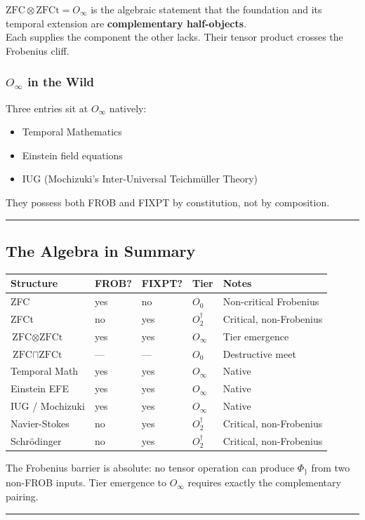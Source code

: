 \documentclass[12pt,a4paper]{article}
\begin{document}
$\text{ZFC} \otimes \text{ZFCt} = O_\infty$ is the algebraic statement that the foundation and its temporal extension are \textbf{complementary half-objects}. \\
Each supplies the component the other lacks. Their tensor product crosses the Frobenius cliff.

\subsubsection*{$O_\infty$ in the Wild}

Three entries sit at $O_\infty$ natively:

\begin{itemize}
    \item Temporal Mathematics
    \item Einstein field equations
    \item IUG (Mochizuki's Inter-Universal Teichmüller Theory)
\end{itemize}

They possess both FROB and FIXPT by constitution, not by composition.

\begin{center}
\rule{0.5\textwidth}{0.4pt}
\end{center}

\subsection*{The Algebra in Summary}

\begin{table}[htbp]
\centering
\small

\begin{tabularx}{\textwidth}{>{\raggedright\arraybackslash}X >{\centering\arraybackslash}X >{\centering\arraybackslash}X >{\centering\arraybackslash}X >{\raggedright\arraybackslash}X}
\toprule
\textbf{Structure} & \textbf{FROB?} & \textbf{FIXPT?} & \textbf{Tier} & \textbf{Notes} \\
\midrule

ZFC & yes & no & $O_0$ & Non-critical Frobenius \\
ZFCt & no & yes & $O_2^\dagger$ & Critical, non-Frobenius \\
$\text{ZFC} \otimes \text{ZFCt}$ & yes & yes & $O_\infty$ & Tier emergence \\
$\text{ZFC} \sqcap \text{ZFCt}$ & --- & --- & $O_0$ & Destructive meet \\
Temporal Math & yes & yes & $O_\infty$ & Native \\
Einstein EFE & yes & yes & $O_\infty$ & Native \\
IUG / Mochizuki & yes & yes & $O_\infty$ & Native \\
Navier-Stokes & no & yes & $O_2^\dagger$ & Critical, non-Frobenius \\
Schrödinger & no & yes & $O_2^\dagger$ & Critical, non-Frobenius \\
\bottomrule
\end{tabularx}
\end{table}

The Frobenius barrier is absolute: no tensor operation can produce $\Phi_{\}}$ from two non-FROB inputs. Tier emergence to $O_\infty$ requires exactly the complementary pairing.

\begin{center}
\rule{0.5\textwidth}{0.4pt}
\end{center}
\end{document}
